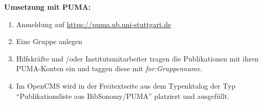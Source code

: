 \textbf{Umsetzung mit PUMA:}\newline
\begin{enumerate}
\item Anmeldung auf \url{https://puma.ub.uni-stuttgart.de} 
\item Eine Gruppe anlegen
\item Hilfskräfte und /oder Institutsmitarbeiter tragen die Publikationen mit ihren PUMA-Konten ein und taggen diese mit \textit{for:Gruppenname}.
\item Im OpenCMS wird in der Freitextseite aus dem Typenktalog der Typ \enquote{Publikationsliste aus BibSonomy/PUMA} platziert und ausgefüllt.
\end{enumerate}